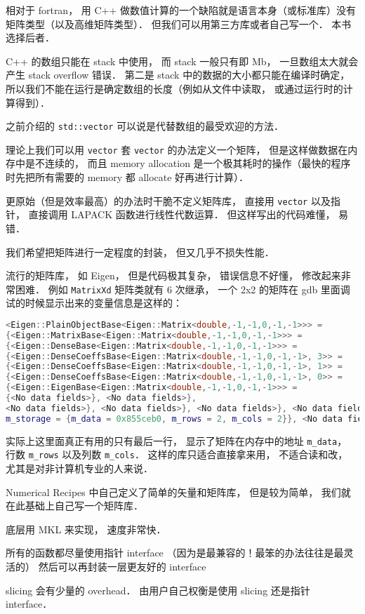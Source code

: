 
相对于 fortran， 用 C++ 做数值计算的一个缺陷就是语言本身（或标准库）没有矩阵类型（以及高维矩阵类型）． 但我们可以用第三方库或者自己写一个． 本书选择后者．

C++ 的数组只能在 stack 中使用， 而 stack 一般只有即 Mb， 一旦数组太大就会产生 stack overflow 错误． 第二是 stack 中的数据的大小都只能在编译时确定， 所以我们不能在运行是确定数组的长度（例如从文件中读取， 或通过运行时的计算得到）．

之前介绍的 \verb|std::vector| 可以说是代替数组的最受欢迎的方法．

理论上我们可以用 \verb|vector| 套 \verb|vector| 的办法定义一个矩阵， 但是这样做数据在内存中是不连续的， 而且 memory allocation 是一个极其耗时的操作（最快的程序时先把所有需要的 memory 都 allocate 好再进行计算）．

更原始（但是效率最高）的办法时干脆不定义矩阵库， 直接用 \verb|vector| 以及指针， 直接调用 LAPACK 函数进行线性代数运算． 但这样写出的代码难懂， 易错．

我们希望把矩阵进行一定程度的封装， 但又几乎不损失性能．

流行的矩阵库， 如 Eigen， 但是代码极其复杂， 错误信息不好懂， 修改起来非常困难． 例如 \verb|MatrixXd| 矩阵类就有 6 次继承， 一个 2x2 的矩阵在 gdb 里面调试的时候显示出来的变量信息是这样的：
\begin{lstlisting}[language=cpp]
<Eigen::PlainObjectBase<Eigen::Matrix<double,-1,-1,0,-1,-1>>> = 
{<Eigen::MatrixBase<Eigen::Matrix<double,-1,-1,0,-1,-1>>> = 
{<Eigen::DenseBase<Eigen::Matrix<double,-1,-1,0,-1,-1>>> = 
{<Eigen::DenseCoeffsBase<Eigen::Matrix<double,-1,-1,0,-1,-1>, 3>> = 
{<Eigen::DenseCoeffsBase<Eigen::Matrix<double,-1,-1,0,-1,-1>, 1>> = 
{<Eigen::DenseCoeffsBase<Eigen::Matrix<double,-1,-1,0,-1,-1>, 0>> = 
{<Eigen::EigenBase<Eigen::Matrix<double,-1,-1,0,-1,-1>>> =
{<No data fields>}, <No data fields>}, 
<No data fields>}, <No data fields>}, <No data fields>}, <No data fields>},
m_storage = {m_data = 0x855ceb0, m_rows = 2, m_cols = 2}}, <No data fields>
\end{lstlisting}
实际上这里面真正有用的只有最后一行， 显示了矩阵在内存中的地址 \verb|m_data|， 行数 \verb|m_rows| 以及列数 \verb|m_cols|． 这样的库只适合直接拿来用， 不适合读和改， 尤其是对非计算机专业的人来说．

Numerical Recipes 中自己定义了简单的矢量和矩阵库， 但是较为简单， 我们就在此基础上自己写一个矩阵库．

底层用 MKL 来实现， 速度非常快．

所有的函数都尽量使用指针 interface （因为是最兼容的！最笨的办法往往是最灵活的） 然后可以再封装一层更友好的 interface

slicing 会有少量的 overhead． 由用户自己权衡是使用 slicing 还是指针 interface．
